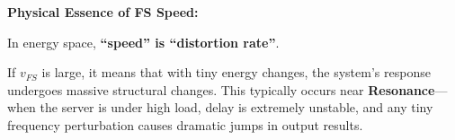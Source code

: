 \textbf{Physical Essence of FS Speed:}

In energy space, \textbf{``speed'' is ``distortion rate''}.

If $v_{FS}$ is large, it means that with tiny energy changes, the system's response undergoes massive structural changes. This typically occurs near \textbf{Resonance}---when the server is under high load, delay is extremely unstable, and any tiny frequency perturbation causes dramatic jumps in output results.

